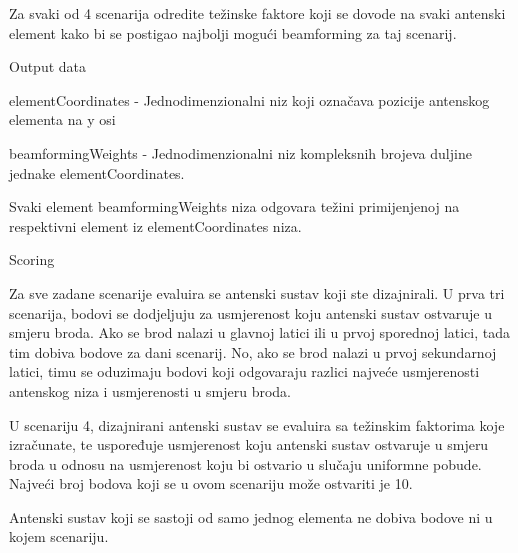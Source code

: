 Za svaki od 4 scenarija odredite težinske faktore koji se dovode na svaki antenski element kako bi se postigao najbolji mogući beamforming za taj scenarij.


Output data

elementCoordinates - Jednodimenzionalni niz koji označava pozicije antenskog elementa na y osi

beamformingWeights - Jednodimenzionalni niz kompleksnih brojeva duljine jednake elementCoordinates.

Svaki element beamformingWeights niza odgovara težini primijenjenoj na respektivni element iz elementCoordinates niza.


Scoring

Za sve zadane scenarije evaluira se antenski sustav koji ste dizajnirali. U prva tri scenarija, bodovi se dodjeljuju za usmjerenost koju antenski sustav ostvaruje u smjeru broda.
Ako se brod nalazi u glavnoj latici ili u prvoj sporednoj latici, tada tim dobiva bodove za dani scenarij. No, ako se brod nalazi u prvoj sekundarnoj latici, timu se oduzimaju bodovi koji odgovaraju razlici najveće usmjerenosti antenskog niza i usmjerenosti u smjeru broda.

U scenariju 4, dizajnirani antenski sustav se evaluira sa težinskim faktorima koje izračunate, te uspoređuje usmjerenost koju antenski sustav ostvaruje u smjeru broda u odnosu na usmjerenost koju bi ostvario u slučaju uniformne pobude. Najveći broj bodova koji se u ovom scenariju može ostvariti je 10.

Antenski sustav koji se sastoji od samo jednog elementa ne dobiva bodove ni u kojem scenariju.
